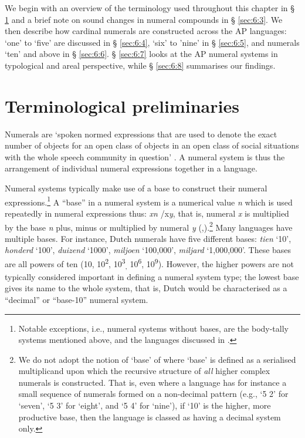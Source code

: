 We begin with an overview of the terminology used throughout this chapter in {\S} \ref{sec:6:2} and a brief note on sound changes in numeral compounds in {\S} \ref{sec:6:3}. We then describe how cardinal numerals are constructed across the AP languages: `one' to `five' are discussed in {\S} \ref{sec:6:4}, `six' to 'nine' in {\S} \ref{sec:6:5}, and numerals `ten' and above in {\S} \ref{sec:6:6}. {\S} \ref{sec:6:7} looks at the AP numeral systems in typological and areal perspective, while {\S} \ref{sec:6:8} summarises our findings.

\section{Terminological preliminaries}\label{sec:6:2}
Numerals are `spoken normed expressions that are used to denote the exact number of objects for an open class of objects in an open class of social situations with the whole speech community in question' \citep[11]{Hammarstrom2010}. A numeral system is thus the arrangement of individual numeral expressions together in a language.

Numeral systems typically make use of a base to construct their numeral expressions.\footnote{Notable exceptions, i.e., numeral systems without bases, are the body-tally systems mentioned above, and the languages discussed in \citet[17-22]{Hammarstrom2010}.} A ``base'' in a numeral system is a numerical value \textit{n} which is used repeatedly in numeral expressions thus: \textit{xn {\textpm}}/x\textit{y}, that is, numeral \textit{x} is multiplied by the base \textit{n} plus, minus or multiplied by numeral \textit{y} (\citealt{Comrie2005numbase},\citealt[15]{Hammarstrom2010}).\footnote{We
 do not adopt the notion of `base' of \citet{Greenberg1978} where `base' is defined as a serialised multiplicand upon which the recursive structure of \textit{all} higher complex numerals is constructed. That is, even where a language has for instance a small sequence of numerals formed on a non-decimal pattern (e.g., `5 2' for `seven', `5 3' for `eight', and `5 4' for `nine'),  if `10' is the higher, more productive base, then the language is classed as having a decimal system only.
}  
Many languages have multiple bases. For instance, Dutch numerals have five different bases: \textit{tien} `10', \textit{honderd} `100', \textit{duizend} `1000', \textit{miljoen} `100,000', \textit{miljard} `1,000,000'. These bases are all powers of ten (10, 10\textsuperscript{2}, 10\textsuperscript{3}\textsubscript{,} 10\textsuperscript{6}, 10\textsuperscript{9}). However, the higher powers are not typically considered important in defining a numeral system type; the lowest base gives its name to the whole system, that is, Dutch would be characterised as a ``decimal'' or ``base-10'' numeral system. 

